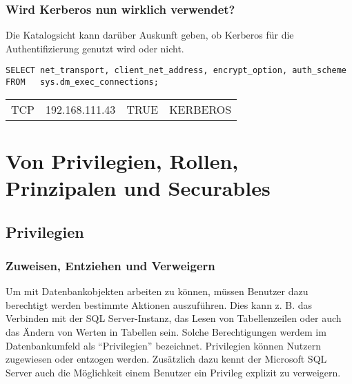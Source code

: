         \subsubsection{Wird Kerberos nun wirklich verwendet?}
          Die Katalogsicht  kann darüber
          Auskunft geben, ob Kerberos für die Authentifizierung genutzt wird
          oder nicht.
          \begin{lstlisting}[language=ms_sql,caption={Wie wird
        authentifiziert?},label=sql19_01]
SELECT net_transport, client_net_address, encrypt_option, auth_scheme
FROM   sys.dm_exec_connections;
        \end{lstlisting}
        \begin{center}
          \begin{small}
            \tablehead{}
            \begin{mssql}
              \begin{supertabular}{llll}
                TCP & 192.168.111.43 & TRUE & KERBEROS \\
              \end{supertabular}
            \end{mssql}
          \end{small}
        \end{center}
    \section{Von Privilegien, Rollen, Prinzipalen und Securables}
      \subsection{Privilegien}
        \subsubsection{Zuweisen, Entziehen und Verweigern}
          Um mit Datenbankobjekten arbeiten zu können, müssen Benutzer dazu
          berechtigt werden bestimmte Aktionen auszuführen. Dies kann z. B. das
          Verbinden mit der SQL Server-Instanz, das Lesen von Tabellenzeilen
          oder auch das Ändern von Werten in Tabellen sein. Solche
          Berechtigungen werdem im Datenbankumfeld als \enquote{Privilegien}
          bezeichnet. Privilegien können Nutzern zugewiesen oder entzogen
          werden. Zusätzlich dazu kennt der Microsoft SQL Server auch die
          Möglichkeit einem Benutzer ein Privileg explizit zu verweigern.
          
